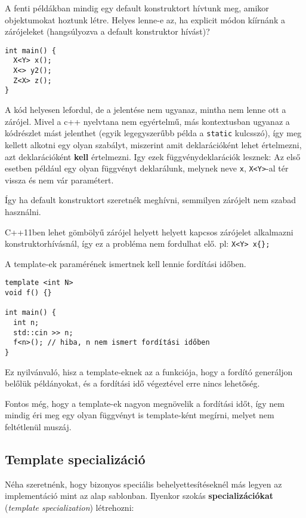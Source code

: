 \documentclass[../cpp_book/cpp_book.tex]{subfiles}
\begin{document}
	A fenti példákban mindig egy default konstruktort hívtunk meg, amikor objektumokat hoztunk létre. Helyes lenne-e az, ha explicit módon kíírnánk a zárójeleket (hangsúlyozva a default konstruktor hívást)?
\begin{lstlisting}
int main() {
  X<Y> x();
  X<> y2();
  Z<X> z();
}
\end{lstlisting}
	A kód helyesen lefordul, de a jelentése nem ugyanaz, mintha nem lenne ott a zárójel. Mivel a c++ nyelvtana nem egyértelmű, más kontextusban ugyanaz a kódrészlet mást jelenthet (egyik legegyszerűbb példa a \texttt{static} kulcsszó), így meg kellett alkotni egy olyan szabályt, miszerint amit deklarációként lehet értelmezni, azt deklarációként \textbf{kell} értelmezni. Igy ezek függvénydeklarációk lesznek: Az első esetben például egy olyan függvényt deklarálunk, melynek neve \texttt{x}, \texttt{X<Y>}-al tér vissza és nem vár paramétert. 
	
	Így ha default konstruktort szeretnék meghívni, semmilyen zárójelt nem szabad használni.
	\begin{note}
		C++11ben lehet gömbölyű zárójel helyett helyett kapcsos zárójelet alkalmazni konstruktorhívásnál, így ez a probléma nem fordulhat elő. pl: \texttt{X<Y> x\{\};}
	\end{note}
	
	A template-ek paramérének ismertnek kell lennie fordítási időben.
	\begin{lstlisting}
template <int N>
void f() {}

int main() {
  int n;
  std::cin >> n;
  f<n>(); // hiba, n nem ismert fordítási időben
}
	\end{lstlisting}
	Ez nyilvánvaló, hisz a template-eknek az a funkciója, hogy a fordító generáljon belőlük példányokat, és a fordítási idő végeztével erre nincs lehetőség.
	\begin{note}
		Fontos még, hogy a template-ek nagyon megnövelik a fordítási időt, így nem mindig éri meg egy olyan függvényt is template-ként megírni, melyet nem feltétlenül muszáj.
	\end{note}
	\subsection{Template specializáció}
	Néha szeretnénk, hogy bizonyos speciális behelyettesítéseknél más legyen az implementáció mint az alap sablonban. Ilyenkor szokás \textbf{specializációkat} (\textit{template specialization}) létrehozni:
	
\end{document}
